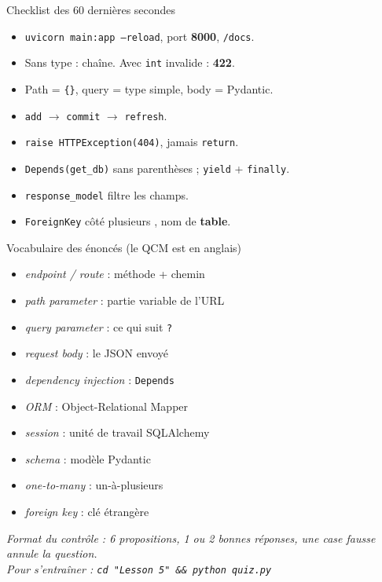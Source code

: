 \documentclass[a4paper,10pt]{article}
\newcommand{\co}[1]{\texttt{\textcolor{codefg}{#1}}}
\begin{document}
\vspace{0.3em}
\begin{astucebox}{Checklist des 60 dernières secondes}
\begin{minipage}[t]{0.485\linewidth}
\begin{itemize}
  \item \co{uvicorn main:app --reload}, port \textbf{8000}, \co{/docs}.
  \item Sans type : chaîne. Avec \co{int} invalide : \textbf{422}.
  \item Path = \co{\{\}}, query = type simple, body = Pydantic.
  \item \co{add} $\to$ \co{commit} $\to$ \co{refresh}.
\end{itemize}
\end{minipage}\hfill
\begin{minipage}[t]{0.485\linewidth}
\begin{itemize}
  \item \co{raise HTTPException(404)}, jamais \co{return}.
  \item \co{Depends(get\_db)} sans parenthèses ; \co{yield} + \co{finally}.
  \item \co{response\_model} filtre les champs.
  \item \co{ForeignKey} côté \og plusieurs \fg, nom de \textbf{table}.
\end{itemize}
\end{minipage}
\end{astucebox}

\vspace{0.4em}
\begin{astucebox}{Vocabulaire des énoncés (le QCM est en anglais)}
\begin{minipage}[t]{0.485\linewidth}
\begin{itemize}
  \item \emph{endpoint / route} : méthode + chemin
  \item \emph{path parameter} : partie variable de l'URL
  \item \emph{query parameter} : ce qui suit \co{?}
  \item \emph{request body} : le JSON envoyé
  \item \emph{dependency injection} : \co{Depends}
\end{itemize}
\end{minipage}\hfill
\begin{minipage}[t]{0.485\linewidth}
\begin{itemize}
  \item \emph{ORM} : Object-Relational Mapper
  \item \emph{session} : unité de travail SQLAlchemy
  \item \emph{schema} : modèle Pydantic
  \item \emph{one-to-many} : un-à-plusieurs
  \item \emph{foreign key} : clé étrangère
\end{itemize}
\end{minipage}
\end{astucebox}

\vspace{0.4em}
\begin{center}
\footnotesize\itshape
Format du contrôle : 6 propositions, 1 ou 2 bonnes réponses, une case fausse
annule la question.\\
Pour s'entraîner : \texttt{cd "Lesson 5" \&\& python quiz.py}
\end{center}
\end{document}

